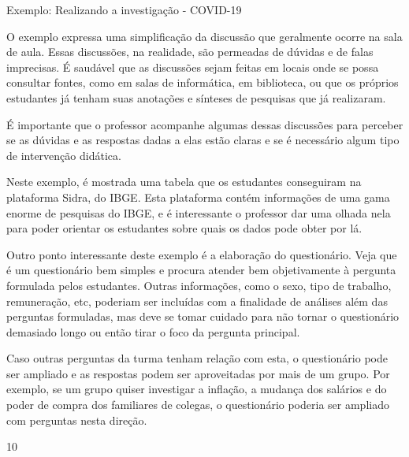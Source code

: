 \clearpage
\begin{sugestions}{Exemplo: Realizando a investigação - COVID-19}
{
  O exemplo expressa uma simplificação da discussão que geralmente ocorre na sala de aula. Essas discussões, na realidade, são permeadas de dúvidas e de falas imprecisas. É saudável que as discussões sejam feitas em locais onde se possa consultar fontes, como em salas de informática, em biblioteca, ou que os próprios estudantes já tenham suas anotações e sínteses de pesquisas que já realizaram.

  É importante que o professor acompanhe algumas dessas discussões para perceber se as dúvidas e as respostas dadas a elas estão claras e se é necessário algum tipo de intervenção didática.

  Neste exemplo, é mostrada uma tabela que os estudantes conseguiram na plataforma Sidra, do IBGE. Esta plataforma contém informações de uma gama enorme de pesquisas do IBGE, e é interessante o professor dar uma olhada nela para poder orientar os estudantes sobre quais os dados pode obter por lá.

  Outro ponto interessante deste exemplo é a elaboração do questionário. Veja que é um questionário bem simples e procura atender bem objetivamente à pergunta formulada pelos estudantes. Outras informações, como o sexo, tipo de trabalho, remuneração, etc, poderiam ser incluídas com a finalidade de análises além das perguntas formuladas, mas deve se tomar cuidado para não tornar o questionário demasiado longo ou então tirar o foco da pergunta principal.

  Caso outras perguntas da turma tenham relação com esta, o questionário pode ser ampliado e as respostas podem ser aproveitadas por mais de um grupo. Por exemplo, se um grupo quiser investigar a inflação, a mudança dos salários e do poder de compra dos familiares de colegas, o questionário poderia ser ampliado com perguntas nesta direção.

}{1}{0}
\end{sugestions}
